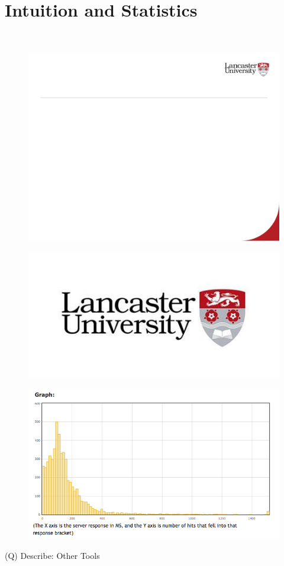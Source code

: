 \documentclass[12pt]{article}
\begin{document}
\section{Intuition and Statistics}
\\
\begin{figure}[H]
\includegraphics[width=0.5\linewidth]{page59-image-1.png}
\end{figure}
\begin{figure}[H]
\includegraphics[width=0.5\linewidth]{page59-image-2.png}
\end{figure}
\begin{figure}[H]
\includegraphics[width=0.5\linewidth]{page59-image-3.png}
\end{figure}
\clearpage
(Q)
Describe: Other Tools
\clearpage
\end{document}
